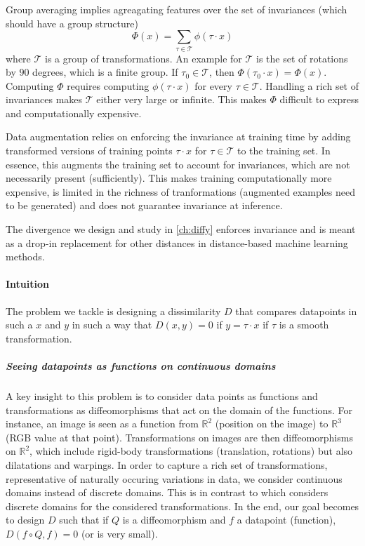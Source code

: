 Group averaging implies agreagating features over the set of invariances (which should have a group structure)
\begin{equation}
    \Phi(x) = \sum_{\tau \in \mathcal T} \phi(\tau \cdot x)
\end{equation}
where $\mathcal T$ is a group of transformations. An example for $\mathcal T$ is the set of rotations by $90$ degrees, which is a finite group. If $\tau_0\in\mathcal T$, then $\Phi(\tau_0 \cdot x) = \Phi(x)$. Computing $\Phi$ requires computing $\phi(\tau \cdot x)$ for every $\tau\in\mathcal T$. Handling a rich set of invariances makes $\mathcal T$ either very large or infinite. This makes $\Phi$ difficult to express and computationally expensive.

Data augmentation relies on enforcing the invariance at training time by adding transformed versions of training points $\tau \cdot x$ for $\tau \in \mathcal T$ to the training set. In essence, this augments the training set to account for invariances, which are not necessarily present (sufficiently). This makes training computationally more expensive, is limited in the richness of tranformations (augmented examples need to be generated) and does not guarantee invariance at inference.

The divergence we design and study in \cref{ch:diffy} enforces invariance and is meant as a drop-in replacement for other distances in distance-based machine learning methods.

\paragraph{Intuition}

The problem we tackle is designing a dissimilarity $D$ that compares datapoints in such a $x$ and $y$ in such a way that $D(x, y) = 0$ if $y = \tau \cdot x$ if $\tau$ is a smooth transformation.

\subparagraph{Seeing datapoints as functions on continuous domains} A key insight to this problem is to consider data points as functions and transformations as diffeomorphisms that act on the domain of the functions. For instance, an image is seen as a function from $\mathbb R^2$ (position on the image) to $\mathbb R^3$ (RGB value at that point). Transformations on images are then diffeomorphisms on $\mathbb R^2$, which include rigid-body transformations (translation, rotations) but also dilatations and warpings.
In order to capture a rich set of transformations, representative of naturally occuring variations in data, we consider continuous domains instead of discrete domains. This is in contrast to \cite{bietti} which considers discrete domains for the considered transformations.
In the end, our goal becomes to design $D$ such that if $Q$ is a diffeomorphism and $f$ a datapoint (function), $D(f\circ Q, f) = 0$ (or is very small).

